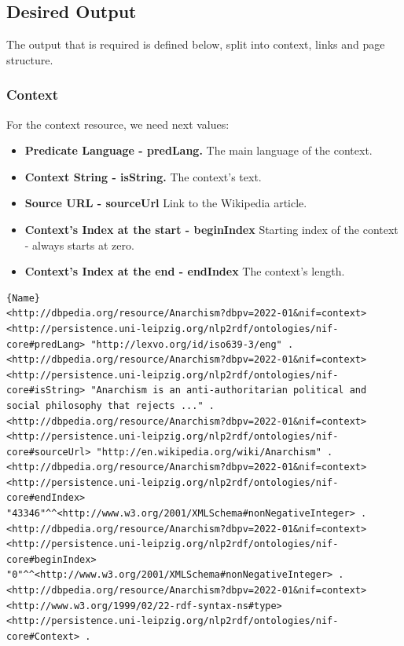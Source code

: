 \documentclass[thesis=M,english,hidelinks]{FITthesis}[2019/12/23]
\begin{document}
\subsection{Desired Output}

The output that is required is defined below\cite{NIF_Format}, split into context, links and page structure. 


\subsubsection{Context}

For the context resource, we need next values:

\begin{itemize}
	\item \textbf{Predicate Language - predLang.} The main language of the context. 
	\item \textbf{Context String - isString.} The context's text.
	\item \textbf{Source URL - sourceUrl} Link to the Wikipedia article.
	\item \textbf{Context's Index at the start - beginIndex} Starting index of the context - always starts at zero.
	\item \textbf{Context's Index at the end - endIndex} The context's length.
\end{itemize}

\begin{lstlisting}[caption=Example of an output for context in NIF format,frame=tlrb,  label = {lst:nif-context}]{Name}
<http://dbpedia.org/resource/Anarchism?dbpv=2022-01&nif=context> <http://persistence.uni-leipzig.org/nlp2rdf/ontologies/nif-core#predLang> "http://lexvo.org/id/iso639-3/eng" .
<http://dbpedia.org/resource/Anarchism?dbpv=2022-01&nif=context> <http://persistence.uni-leipzig.org/nlp2rdf/ontologies/nif-core#isString> "Anarchism is an anti-authoritarian political and social philosophy that rejects ..." .
<http://dbpedia.org/resource/Anarchism?dbpv=2022-01&nif=context> <http://persistence.uni-leipzig.org/nlp2rdf/ontologies/nif-core#sourceUrl> "http://en.wikipedia.org/wiki/Anarchism" .
<http://dbpedia.org/resource/Anarchism?dbpv=2022-01&nif=context> <http://persistence.uni-leipzig.org/nlp2rdf/ontologies/nif-core#endIndex> "43346"^^<http://www.w3.org/2001/XMLSchema#nonNegativeInteger> .
<http://dbpedia.org/resource/Anarchism?dbpv=2022-01&nif=context> <http://persistence.uni-leipzig.org/nlp2rdf/ontologies/nif-core#beginIndex> "0"^^<http://www.w3.org/2001/XMLSchema#nonNegativeInteger> .
<http://dbpedia.org/resource/Anarchism?dbpv=2022-01&nif=context> <http://www.w3.org/1999/02/22-rdf-syntax-ns#type> <http://persistence.uni-leipzig.org/nlp2rdf/ontologies/nif-core#Context> .
\end{lstlisting}
\end{document}

